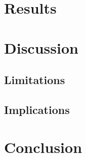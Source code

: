 \section{\centering Results}

\section{\centering Discussion}
\subsection{Limitations}
\subsection{Implications}
\section{\centering Conclusion}
